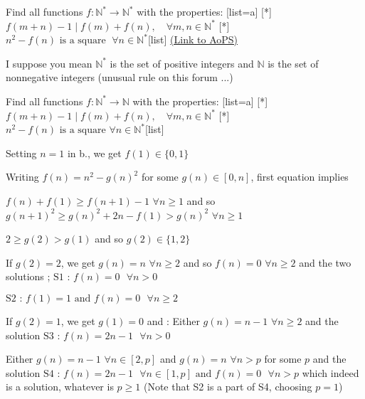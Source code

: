 \begin{problem}
	Find all functions $f:\mathbb{N}^{\ast}\rightarrow\mathbb{N}^{\ast}$ with
the properties:
[list=a]
[*]$ f(m+n)  -1 \mid f(m)+f(n),\quad  \forall m,n\in\mathbb{N}^{\ast} $
[*]$ n^{2}-f(n)\text{ is a square } \;\forall n\in\mathbb{N}^{\ast} $[\/list]
	\flushright \href{https://artofproblemsolving.com/community/c6h593728}{(Link to AoPS)}
\end{problem}



\begin{solution}
	I suppose you mean $\mathbb N^*$ is the set of positive integers and $\mathbb N$ is the set of nonnegative integers (unusual rule on this forum ...)

\begin{tcolorbox}Find all functions $f:\mathbb{N}^{\ast}\rightarrow\mathbb{N}$ with
the properties:
[list=a]
[*]$ f(m+n)  -1 \mid f(m)+f(n),\quad  \forall m,n\in\mathbb{N}^{\ast} $
[*]$ n^{2}-f(n)\text{ is a square } \forall n\in\mathbb{N}^{\ast} $[\/list]\end{tcolorbox}
Setting $n=1$ in b., we get $f(1)\in\{0,1\}$

Writing $f(n)=n^2-g(n)^2$ for some $g(n)\in[0,n]$, first equation implies

$f(n)+f(1)\ge f(n+1)-1$ $\forall n\ge 1$ and so $g(n+1)^2\ge g(n)^2+2n-f(1)>g(n)^2$ $\forall n\ge 1$

$2\ge g(2)>g(1)$ and so $g(2)\in\{1,2\}$

If $g(2)=2$, we get $g(n)=n$ $\forall n\ge 2$ and so $f(n)=0$ $\forall n\ge 2$ and the two solutions ;
$\boxed{\text{S1 : }f(n)=0\text{   }\forall n>0}$

$\boxed{\text{S2 : }f(1)=1\text{ and }f(n)=0\text{   }\forall n\ge 2}$

If $g(2)=1$, we get $g(1)=0$ and :
Either $g(n)=n-1$ $\forall n\ge 2$ and the solution $\boxed{\text{S3 : }f(n)=2n-1\text{   }\forall n>0}$

Either $g(n)=n-1$ $\forall n\in[2,p]$ and $g(n)=n$ $\forall n>p$ for some $p$ and the solution 
$\boxed{\text{S4 : }f(n)=2n-1\text{   }\forall n\in[1,p]\text{ and }f(n)=0\text{   }\forall n>p}$ which indeed is a solution, whatever is $p\ge 1$
(Note that S2 is a part of S4, choosing $p=1$)
\end{solution}



